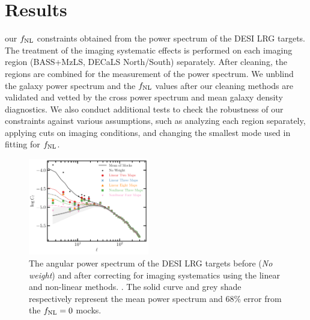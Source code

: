 \section{Results}\label{sec:results}
 our $f_{\rm NL}$ constraints obtained from the power spectrum of the DESI LRG targets. The treatment of the imaging systematic effects is performed on each imaging region (BASS+MzLS, DECaLS North/South) separately. After cleaning, the regions are combined for the measurement of the power spectrum. We unblind the galaxy power spectrum and the $f_{\rm NL}$ values after our cleaning methods are validated and vetted by the cross power spectrum and mean galaxy density diagnostics. We also conduct additional tests to check the robustness of our constraints against various assumptions, such as analyzing each region separately, applying cuts on imaging conditions, and changing the smallest mode used in fitting for $f_{\rm NL}$.


\begin{figure}
    \centering
    \includegraphics[width=0.47\textwidth]{figures/model_dr9.pdf} 
    \caption{ The angular power spectrum of the DESI LRG targets before (\textit{No weight}) and after correcting for imaging systematics using the linear and non-linear methods. . The solid curve and grey shade respectively represent the mean power spectrum and $68\%$ error from the $f_{\rm NL}=0$ mocks.}
    \label{fig:cl_dr9}
\end{figure}


